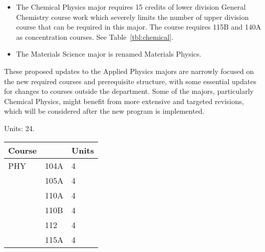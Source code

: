 \documentclass[12pt]{article}
\begin{document}
\begin{itemize}
\item The Chemical Physics major requires 15 credits of lower division General Chemistry course work which severely limits the number of upper division course that can be required in this major.  The course requires 115B and 140A as concentration courses.  See Table~\ref{tbl:chemical}.

\item The Materials Science major is renamed Materials Physics.
  
\end{itemize}
These proposed updates to the Applied Physics majors are narrowly
focused on the new required courses and prerequisite structure, with
some essential updates for changes to courses outside the department.
Some of the majors, particularly Chemical Physics, might benefit from
more extensive and targeted revisions, which will be considered after
the new program is implemented.


\noindent
\vskip 0.25cm
\begin{center}
Units:  24. 
\begin{tabular}{|lll|}
\hline
Course & & Units \\
\hline
PHY & 104A   & 4 \\  
    & 105A   & 4 \\ 
    & 110A   & 4 \\ 
    & 110B   & 4 \\
    & 112    & 4 \\
    & 115A   & 4 \\ 
\hline
\end{tabular}
\end{center}
\end{document}
